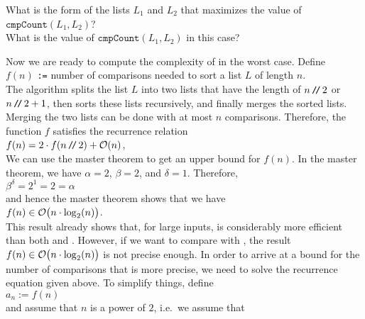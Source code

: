 \exercise
What is the form of the lists $L_1$ and $L_2$ that maximizes the value of 
\\[0.2cm]
\hspace*{1.3cm}
$\mathtt{cmpCount}(L_1, L_2)$?
\\[0.2cm]
What is the value of $\mathtt{cmpCount}(L_1, L_2)$ in this case? \eox
\vspace*{0.3cm}

\noindent
Now we are ready to compute the complexity of  in the worst case.  Define
\\[0.2cm]
\hspace*{1.3cm}
$f(n)$  \texttt{:=} number of comparisons needed to sort a list $L$ of length $n$.
\\[0.2cm]
The algorithm  
splits the list $L$ into two lists that have the length of $n\mbox{\,\texttt{/}$\!$\texttt{/}\,} 2$ or $n\mbox{\,\texttt{/}$\!$\texttt{/}\,} 2+1$, then sorts
these lists recursively, and finally merges the sorted lists.  Merging the two lists can be done with
at most $n$ comparisons.  Therefore, the function $f$ satisfies the recurrence relation
\\[0.2cm]
\hspace*{1.3cm}
$f(n) = 2 \cdot f(n \mbox{\,\texttt{/}$\!$\texttt{/}\,}  2) + \mathcal{O}(n)$,
\\[0.2cm]
We can use the master theorem to get an upper bound for $f(n)$.  In the master theorem, we have
$\alpha = 2$, $\beta = 2$, and $\delta = 1$. Therefore,
\\[0.2cm]
\hspace*{1.3cm}
$\beta^\delta = 2^1 = 2 = \alpha$
\\[0.2cm]
and hence the master theorem shows that we have
\\[0.2cm]
\hspace*{1.3cm}
$f(n) \in \mathcal{O}\bigl(n \cdot \log_2(n) \bigr)$.
\\[0.2cm]
This result already shows that, for large inputs,  is considerably more efficient
than both  and .  However, if we want to compare
 with , the result $f(n) \in \mathcal{O}\bigl(n \cdot \log_2(n) \bigr)$ is
not precise enough.  In order to arrive at a bound for the number of comparisons that is more precise,
we need to solve the recurrence equation given above.  To simplify things,  define
\\[0.2cm]
\hspace*{1.3cm}
$a_n := f(n)$ 
\\[0.2cm]
and assume that $n$ is a power of $2$, i.e.~we assume that
\\[0.2cm]
